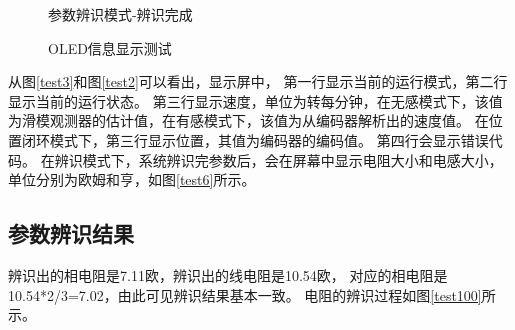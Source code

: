 ﻿\documentclass[12pt,a4paper]{article}
\begin{document}
\begin{figure}[!htbp]
\begin{minipage}{0.29\linewidth}
    \caption{参数辨识模式-辨识完成}
    \label{test6}%
  \end{minipage}
  \caption{OLED信息显示测试}
  \label{test1}
\end{figure}
从图\ref{test3}和图\ref{test2}可以看出，显示屏中，
第一行显示当前的运行模式，第二行显示当前的运行状态。
第三行显示速度，单位为转每分钟，在无感模式下，该值为滑模观测器的估计值，在有感模式下，该值为从编码器解析出的速度值。
在位置闭环模式下，第三行显示位置，其值为编码器的编码值。
第四行会显示错误代码。
在辨识模式下，系统辨识完参数后，会在屏幕中显示电阻大小和电感大小，单位分别为欧姆和亨，如图\ref{test6}所示。

\subsection{参数辨识结果}
辨识出的相电阻是7.11欧，辨识出的线电阻是10.54欧，
对应的相电阻是10.54*2/3=7.02，由此可见辨识结果基本一致。
电阻的辨识过程如图\ref{test100}所示。
\end{document}
